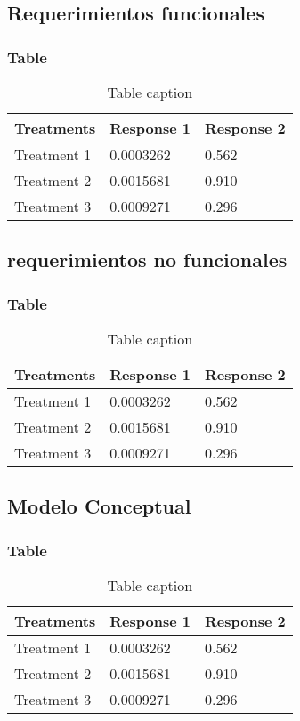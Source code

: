 \documentclass{beamer}
\begin{document}
\subsection{Requerimientos funcionales} 
\begin{frame}
\frametitle{Table}
\begin{table}
\begin{tabular}{l l l}
\toprule
\textbf{Treatments} & \textbf{Response 1} & \textbf{Response 2}\\
\midrule
Treatment 1 & 0.0003262 & 0.562 \\
Treatment 2 & 0.0015681 & 0.910 \\
Treatment 3 & 0.0009271 & 0.296 \\
\bottomrule
\end{tabular}
\caption{Table caption}
\end{table}
\end{frame}

\subsection{requerimientos no funcionales} 
\begin{frame}
\frametitle{Table}
\begin{table}
\begin{tabular}{l l l}
\toprule
\textbf{Treatments} & \textbf{Response 1} & \textbf{Response 2}\\
\midrule
Treatment 1 & 0.0003262 & 0.562 \\
Treatment 2 & 0.0015681 & 0.910 \\
Treatment 3 & 0.0009271 & 0.296 \\
\bottomrule
\end{tabular}
\caption{Table caption}
\end{table}
\end{frame}
\subsection{Modelo Conceptual} 
\begin{frame}
\frametitle{Table}
\begin{table}
\begin{tabular}{l l l}
\toprule
\textbf{Treatments} & \textbf{Response 1} & \textbf{Response 2}\\
\midrule
Treatment 1 & 0.0003262 & 0.562 \\
Treatment 2 & 0.0015681 & 0.910 \\
Treatment 3 & 0.0009271 & 0.296 \\
\bottomrule
\end{tabular}
\caption{Table caption}
\end{table}
\end{frame}
\end{document}
